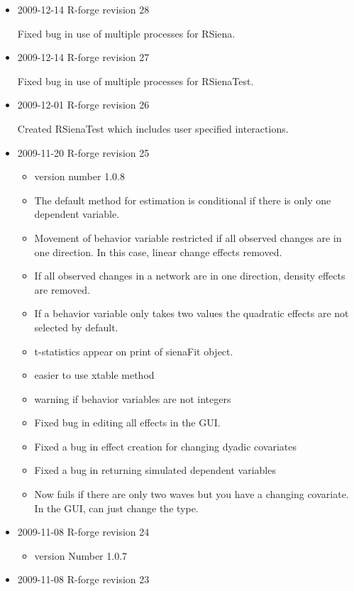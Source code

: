 \documentclass[a4paper,fleqn,11pt]{article}
\newcommand{\+}{\, + \,}
\newcommand{\sfn}[1]{\textsf{#1}}
\begin{document}
{\begin{small}
\begin{itemize}
Fixed bug in 3-way interactions in RSienaTest

\item 2009-12-14 R-forge revision 28

 Fixed bug in use of multiple processes for RSiena.

\item 2009-12-14 R-forge revision 27

Fixed bug in use of multiple processes for
  RSienaTest.

\item 2009-12-01 R-forge revision 26

Created RSienaTest which includes user
  specified interactions.

\item 2009-11-20 R-forge revision 25

  \begin{itemize}
  \item  version number 1.0.8
  \item The default method for estimation is conditional if there is only one
    dependent variable.
  \item Movement of behavior variable restricted if all observed changes are in
    one direction. In this case, linear change effects removed.
  \item If all observed changes in a network are in one direction, density
    effects are removed.
  \item If a behavior variable only takes two values the quadratic effects
    are not selected by default.
  \item t-statistics appear on print of \sfn{sienaFit} object.
  \item easier to use \sfn{xtable} method
  \item warning if behavior variables are not integers
  \item Fixed bug in editing all effects in the GUI.
  \item Fixed a bug in effect creation for changing dyadic covariates
  \item Fixed a bug in returning simulated dependent variables
  \item Now fails if there are only two waves but you have a changing
    covariate. In the GUI, can just change the type.
  \end{itemize}

\item 2009-11-08 R-forge revision 24

  \begin{itemize}
  \item
    version Number 1.0.7
  \end{itemize}
\item  2009-11-08 R-forge revision 23


\end{itemize}
\end{small}}
\end{document}
